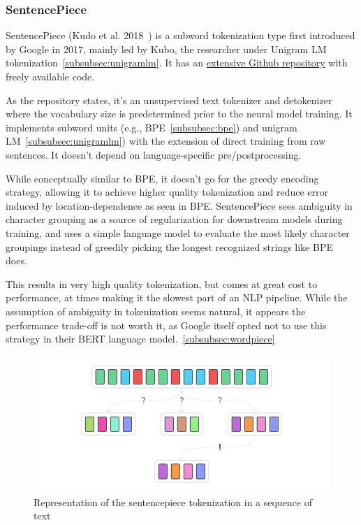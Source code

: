 \subsubsection{SentencePiece}

SentencePiece (Kudo et al. 2018~\cite{kudo2018sentencepiece}) is a subword tokenization type first introduced by Google in 2017, mainly led by Kubo, the researcher under Unigram LM tokenization~\ref{subsubsec:unigramlm}. It has an \href{https://github.com/google/sentencepiece}{extensive Github repository} with freely available code.

As the repository states, it's an unsupervised text tokenizer and detokenizer where the vocabulary size is predetermined prior to the neural model training. It implements subword units (e.g., BPE~\ref{subsubsec:bpe}) and unigram LM~\ref{subsubsec:unigramlm}) with the extension of direct training from raw sentences. It doesn't depend on language-specific pre/postprocessing.

While conceptually similar to BPE, it doesn't go for the greedy encoding strategy, allowing it to achieve higher quality tokenization and reduce error induced by location-dependence as seen in BPE. SentencePiece sees ambiguity in character grouping as a source of regularization for downstream models during training, and uses a simple language model to evaluate the most likely character groupings instead of greedily picking the longest recognized strings like BPE does.

This results in very high quality tokenization, but comes at great cost to performance, at times making it the slowest part of an NLP pipeline. While the assumption of ambiguity in tokenization seems natural, it appears the performance trade-off is not worth it, as Google itself opted not to use this strategy in their BERT language model.~\ref{subsubsec:wordpiece}

\begin{figure}[!ht]
    \centering
    \includegraphics[width=12cm]{figures/sentencepiece.png}
    \caption{Representation of the sentencepiece tokenization in a sequence of text}
\end{figure}

